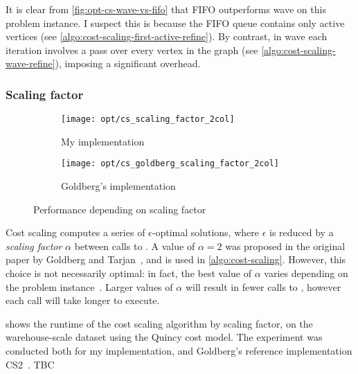 It is clear from \cref{fig:opt-cs-wave-vs-fifo} that FIFO outperforms wave on this problem instance. I suspect this is because the FIFO queue contains only active vertices (see \cref{algo:cost-scaling-first-active-refine}). By contrast, in wave each iteration involves a pass over every vertex in the graph (see \cref{algo:cost-scaling-wave-refine}), imposing a significant overhead.


\subsubsection{Scaling factor}

\begin{figure}
    \begin{subfigure}[c]{0.5\textwidth}
        \texttt{[image: opt/cs\_scaling\_factor\_2col]}
        \caption{My implementation}
    \end{subfigure}
    \begin{subfigure}[c]{0.5\textwidth}
        \texttt{[image: opt/cs\_goldberg\_scaling\_factor\_2col]}
        \caption{Goldberg's implementation}
    \end{subfigure}
    \caption{Performance depending on scaling factor}
    \label{fig:opt-cs-scaling-factor}
\end{figure}

Cost scaling computes a series of $\epsilon$-optimal solutions, where $\epsilon$ is reduced by a \emph{scaling factor} $\alpha$ between calls to . A value of $\alpha=2$ was proposed in the original paper by Goldberg and Tarjan~\cite{Goldberg:1987}, and is used in \cref{algo:cost-scaling}. However, this choice is not necessarily optimal: in fact, the best value of $\alpha$ varies depending on the problem instance~\cite[\S7]{Goldberg:1997}. Larger values of $\alpha$ will result in fewer calls to , however each call will take longer to execute.

 shows the runtime of the cost scaling algorithm by scaling factor, on the warehouse-scale dataset using the Quincy cost model. The experiment was conducted both for my implementation, and Goldberg's reference implementation CS2~\cite{CS2:2009}. TBC

